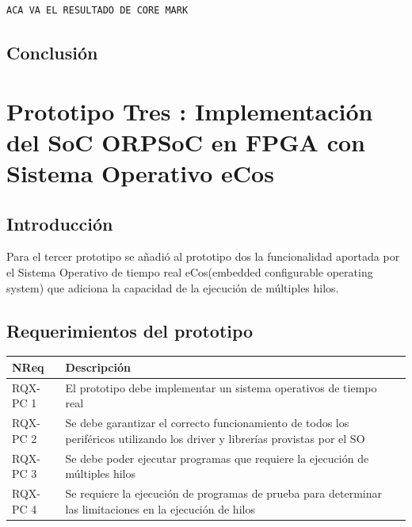 \begin{lstlisting}[frame=single,caption={Salida de la terminal serie de los resultados de la ejecución del benchmark},label={lst:rescrm}]
 ACA VA EL RESULTADO DE CORE MARK
\end{lstlisting}

		\section{Conclusión}

\newpage
\chapter{Prototipo Tres : Implementación del SoC ORPSoC en FPGA con Sistema Operativo eCos}
		\section{Introducción}

		Para el tercer prototipo se añadió al prototipo dos la funcionalidad aportada por el Sistema Operativo de tiempo real eCos(embedded configurable operating system) que adiciona la capacidad de la ejecución de múltiples hilos. 


		\section{Requerimientos del prototipo}

		\begin{table}[h!]
		\centering		
		\begin{tabular}{ p{2.5cm} p{8cm} p{3cm} }
		\hline 
		\rowcolor[gray]{0.8} N\textordmasculine Req & Descripción\\
		\hline 
		RQX-PC 1 & El prototipo debe implementar un sistema operativos de tiempo real\\ 
		\hline 
		RQX-PC 2 & Se debe garantizar el correcto funcionamiento de todos los periféricos utilizando los driver y librerías provistas por el SO \\ 
		\hline 
		RQX-PC 3 & Se debe poder ejecutar programas que requiere la ejecución de múltiples hilos  \\ 
		\hline
		RQX-PC 4 & Se requiere la ejecución de programas de prueba para determinar las limitaciones en la ejecución de hilos \\ 
		\hline		
		\end{tabular}
		\end{table}
		

